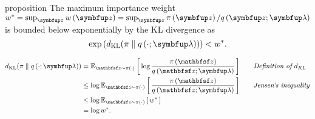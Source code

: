 
\begin{theoremEnd}{proposition}\label{thm:wstar}
The maximum importance weight
\(w^* = \sup_{\vz} w\left(\vz\right) = \sup_{\vz} \pi\left(\vz\right)/q\left(\vz;\vlambda\right)\)
is bounded below exponentially by the KL divergence as
\[
    \exp\left( \DKL{\pi}{q\left(\cdot; \vlambda\right)} \right) < w^*.
\]
\end{theoremEnd}
\begin{proofEnd}
  \begin{alignat*}{2}
    \DKL{\pi}{q\left(\cdot; \vlambda\right)}
    &=
    \Esub{\rvvz \sim \pi\left(\cdot\right)}{ \log \frac{\pi\left(\rvvz\right)}{q\left(\rvvz; \vlambda\right)} }
    &&\quad\text{\textit{Definition of \(d_{\text{KL}}\)}}
    \\
    &\leq
    \log \Esub{\rvvz \sim \pi\left(\cdot\right)}{ \frac{\pi\left(\rvvz\right)}{q\left(\rvvz; \vlambda\right)} }
    &&\quad\text{\textit{Jensen's inequality}}
    \\
    &\leq
    \log \Esub{\rvvz \sim \pi\left(\cdot\right)}{ w^* }
    \\
    &=
    \log w^*.
  \end{alignat*}
\end{proofEnd}

